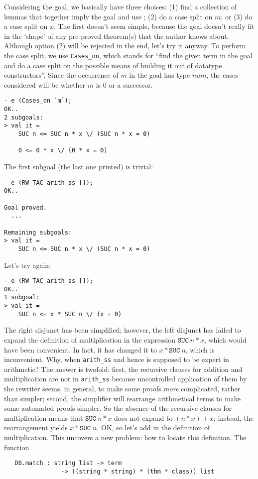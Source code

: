 Considering the goal, we basically have three choices: (1) find a
collection of lemmas that together imply the goal and use
; (2) do a case split on $m$; or (3) do a case split on
$x$. The first doesn't seem simple, because the goal doesn't really fit
in the `shape' of any pre-proved theorem(s) that the author knows
about. Although option (2) will be rejected in the end, let's try it
anyway. To perform the case split, we use \verb+Cases_on+, which stands
for ``find the given term in the goal and do a case split on the
possible means of building it out of datatype constructors''. Since the
occurrence of $m$ in the goal has type $num$, the cases considered will
be whether $m$ is $0$ or a successor.
\begin{session}
\begin{verbatim}
- e (Cases_on `m`);
OK..
2 subgoals:
> val it =
    SUC n <= SUC n * x \/ (SUC n * x = 0)

    0 <= 0 * x \/ (0 * x = 0)
\end{verbatim}
\end{session}
\noindent The first subgoal (the last one printed) is trivial:

\begin{session}
\begin{verbatim}
- e (RW_TAC arith_ss []);
OK..

Goal proved.
  ...

Remaining subgoals:
> val it =
    SUC n <= SUC n * x \/ (SUC n * x = 0)
\end{verbatim}
\end{session}
\noindent Let's try  again:
\begin{session}
\begin{verbatim}
- e (RW_TAC arith_ss []);
OK..
1 subgoal:
> val it =
    SUC n <= x * SUC n \/ (x = 0)
\end{verbatim}
\end{session}
The right disjunct has been simplified; however, the left disjunct has
failed to expand the definition of multiplication in the expression
$\mathtt{SUC}\ n * x$, which would have been convenient. In fact, it has
changed it to $x * \mathtt{SUC}\ n$, which is inconvenient.
Why, when \verb+arith_ss+ and hence  is supposed to be expert in
arithmetic? The answer is twofold: first, the recursive clauses for addition and
multiplication are not in \verb+arith_ss+ because uncontrolled
application of them by the rewriter seems, in general, to make some
proofs \emph{more} complicated, rather than simpler; second, the simplifier
will rearrange arithmetical terms to make some automated proofs simpler. So
the absence of the recursive clauses for multiplication
means that $\mathtt{SUC}\ n * x$ does not expand to $(n * x) + x$;
instead, the rearrangement yields $x * \mathtt{SUC}\; n$. OK, so let's
add in the definition of multiplication. This uncovers a new problem: how
to locate this definition. The function
\begin{holboxed}
\begin{verbatim}
   DB.match : string list -> term
                -> ((string * string) * (thm * class)) list
\end{verbatim}
\end{holboxed}

